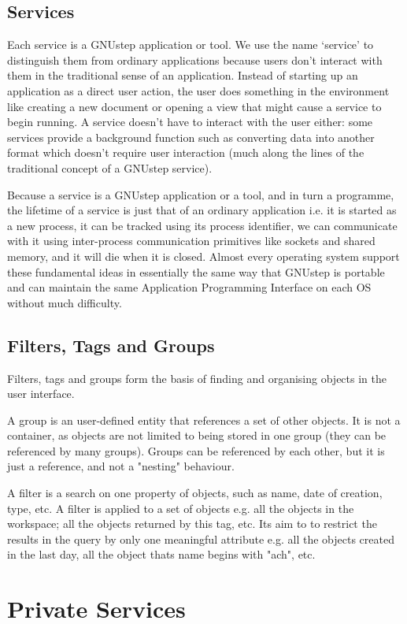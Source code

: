 \documentclass[11pt]{report}
\newcommand{\gnustep}{GNUstep\xspace}
\begin{document}
\subsection{Services}
Each service is a GNUstep application or tool. We use the name `service' to distinguish them from ordinary applications because users don't interact with them in the traditional sense of an application. Instead of starting up an application as a direct user action, the user does something in the environment like creating a new document or opening a view that might cause a service to begin running. A service doesn't have to interact with the user either: some services provide a background function such as converting data into another format which doesn't require user interaction (much along the lines of the traditional concept of a \gnustep service).

Because a service is a GNUstep application or a tool, and in turn a programme, the lifetime of a service is just that of an ordinary application i.e. it is started as a new process, it can be tracked using its process identifier, we can communicate with it using inter-process communication primitives like sockets and shared memory, and it will die when it is closed. Almost every operating system support these fundamental ideas in essentially the same way that GNUstep is portable and can maintain the same Application Programming Interface on each OS without much difficulty.  

\subsection{Filters, Tags and Groups}
Filters, tags and groups form the basis of finding and organising objects in the user interface.

A group is an user-defined entity that references a set of other objects. It is not a container, as objects are not limited to being stored in one group (they can be referenced by many groups). Groups can be referenced by each other, but it is just a reference, and not a "nesting" behaviour.

A filter is a search on one property of objects, such as name, date of creation, type, etc. A filter is applied to a set of objects e.g. all the objects in the workspace; all the objects returned by this tag, etc. Its aim to to restrict the results in the query by only one meaningful attribute e.g. all the objects created in the last day, all the object thats name begins with "ach", etc.
\section{Private Services}
\end{document}
